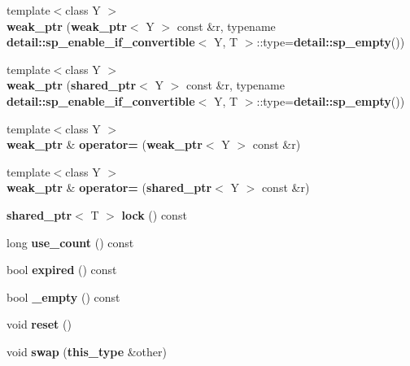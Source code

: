 \begin{DoxyCompactItemize}
\item 
{\footnotesize template$<$class Y $>$ }\\{\bfseries weak\+\_\+ptr} ({\bf weak\+\_\+ptr}$<$ Y $>$ const \&r, typename {\bf detail\+::sp\+\_\+enable\+\_\+if\+\_\+convertible}$<$ Y, T $>$\+::type={\bf detail\+::sp\+\_\+empty}())\label{classbooster_1_1weak__ptr_a024245854350fceeacfd2cc697fa2766}

\item 
{\footnotesize template$<$class Y $>$ }\\{\bfseries weak\+\_\+ptr} ({\bf shared\+\_\+ptr}$<$ Y $>$ const \&r, typename {\bf detail\+::sp\+\_\+enable\+\_\+if\+\_\+convertible}$<$ Y, T $>$\+::type={\bf detail\+::sp\+\_\+empty}())\label{classbooster_1_1weak__ptr_a58ef0b8a6decf6619ad1617a2fa1dfd9}

\item 
{\footnotesize template$<$class Y $>$ }\\{\bf weak\+\_\+ptr} \& {\bfseries operator=} ({\bf weak\+\_\+ptr}$<$ Y $>$ const \&r)\label{classbooster_1_1weak__ptr_a6aaf5ebf622698f39eeaa3b26407b941}

\item 
{\footnotesize template$<$class Y $>$ }\\{\bf weak\+\_\+ptr} \& {\bfseries operator=} ({\bf shared\+\_\+ptr}$<$ Y $>$ const \&r)\label{classbooster_1_1weak__ptr_a3f90497217adaf9deb61df27c2690a6a}

\item 
{\bf shared\+\_\+ptr}$<$ T $>$ {\bfseries lock} () const \label{classbooster_1_1weak__ptr_aaa901127382ac08b3ff9ae1e7d73562b}

\item 
long {\bfseries use\+\_\+count} () const \label{classbooster_1_1weak__ptr_ac56c9a23fd4d8c10577217ce1b67fefb}

\item 
bool {\bfseries expired} () const \label{classbooster_1_1weak__ptr_a6c9ffc68620747ac35daf23abacd03dd}

\item 
bool {\bfseries \+\_\+empty} () const \label{classbooster_1_1weak__ptr_a5542a1c96988b75ed396a7152c61d2dd}

\item 
void {\bfseries reset} ()\label{classbooster_1_1weak__ptr_a9f7c81a5b633fefbf85b884344b93749}

\item 
void {\bfseries swap} ({\bf this\+\_\+type} \&other)\label{classbooster_1_1weak__ptr_aeb4c669b4fec5e924788445ebc24c6a8}


\end{DoxyCompactItemize}
